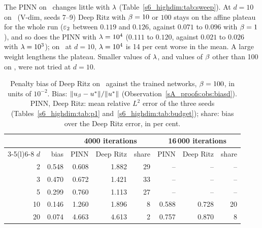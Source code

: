 The PINN on \Pone\ changes little with $\lambda$ (Table~\ref{s6_highdim:tab:sweep}).
At $d=10$ on \Ptwo\ (\textsf{V-dim}, seeds 7--9) Deep Ritz with $\beta=10$ or $100$ stays on the
affine plateau for the whole run ($\varepsilon_{2}$ between $0.119$ and $0.126$, against $0.071$ to $0.096$
with $\beta=1$), and so does the PINN with $\lambda=10^4$ ($0.111$ to $0.120$, against $0.021$ to
$0.026$ with $\lambda=10^3$); on \Pone\ at $d=10$, $\lambda=10^4$ is 14 per cent worse in the mean. A
large weight lengthens the plateau. Smaller values of $\lambda$, and values of $\beta$ other than 100
on \Pone, were not tried at $d=10$.

\begin{table}[tbp]
\centering
\caption{Penalty bias of Deep Ritz on \Pone\ against the trained networks, $\beta=100$, in
units of $10^{-2}$. Bias: $\lVert u_{\beta}-u^{*}\rVert/\lVert u^{*}\rVert$
(Observation~\ref{sA_proofs:obs:biasd}). PINN, Deep Ritz: mean relative $L^2$ error of the
three seeds (Tables~\ref{s6_highdim:tab:p1} and~\ref{s6_highdim:tab:budget}); share: bias
over the Deep Ritz error, in per cent.}
\label{s6_highdim:tab:bias}
\small
\setlength{\tabcolsep}{6pt}
\begin{tabular}{@{}rrrrrrrr@{}}
\toprule
 & & \multicolumn{3}{c}{4000 iterations} & \multicolumn{3}{c}{16\,000 iterations} \\
\cmidrule(lr){3-5}\cmidrule(l){6-8}
$d$ & bias & PINN & Deep Ritz & share & PINN & Deep Ritz & share \\
\midrule
2 & 0.548 & 0.608 & 1.882 & 29 & -- & -- & -- \\
3 & 0.470 & 0.672 & 1.421 & 33 & -- & -- & -- \\
5 & 0.299 & 0.760 & 1.113 & 27 & -- & -- & -- \\
10 & 0.146 & 1.260 & 1.896 & 8 & 0.588 & 0.728 & 20 \\
20 & 0.074 & 4.663 & 4.613 & 2 & 0.757 & 0.870 & 8 \\
\bottomrule
\end{tabular}
\end{table}

